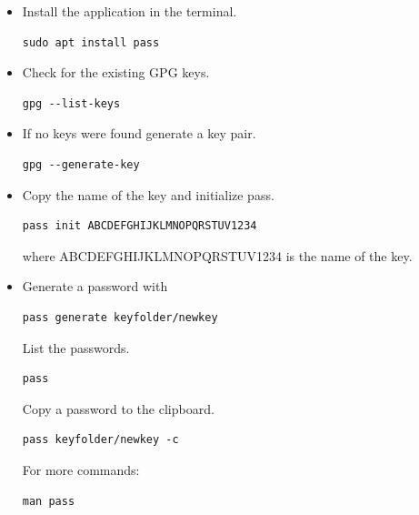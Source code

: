 \documentclass{article}
\begin{document}
\begin{itemize}
\item Install the application in the terminal. \\
\begin{verbatim}
sudo apt install pass  
\end{verbatim}
\item Check for the existing GPG keys. \\
\begin{verbatim}
gpg --list-keys 
\end{verbatim}
\item If no keys were found generate a key pair. \\
\begin{verbatim}
gpg --generate-key
\end{verbatim}
\item Copy the name of the key and initialize pass.\\
\begin{verbatim}
pass init ABCDEFGHIJKLMNOPQRSTUV1234
\end{verbatim}
where ABCDEFGHIJKLMNOPQRSTUV1234 is the name of the key.
\item Generate a password with \\
\begin{verbatim}
pass generate keyfolder/newkey 
\end{verbatim}
List the passwords.
\begin{verbatim}
pass
\end{verbatim}
Copy a password to the clipboard. \\
\begin{verbatim}
pass keyfolder/newkey -c
\end{verbatim}
For more commands:
\begin{verbatim}
man pass
\end{verbatim}
\end{itemize}
\end{document}

